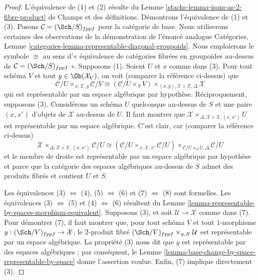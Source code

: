\begin{proof}
L'équivalence de (1) et (2) résulte du
Lemme \ref{stacks-lemma-isom-as-2-fibre-product} de Champs
et des définitions.
Démontrons l'équivalence de (1) et (3).
Posons $\mathcal{C} = (\Sch/S)_{fppf}$ pour la catégorie de base.
Nous utiliserons certaines des observations de la démonstration de l'énoncé analogue
Catégories, Lemme \ref{categories-lemma-representable-diagonal-groupoids}.
Nous emploierons le symbole $\cong$ au sens d'« équivalence de catégories fibrées
en groupoïdes au-dessus de $\mathcal{C} = (\Sch/S)_{fppf}$ ».
Supposons (1). Soient $U$ et $x$ comme dans (3). Pour tout schéma $V$
et tout $y \in \Ob(\mathcal{X}_V)$, on voit (comparer la référence ci-dessus) que
$$
\mathcal{C}/U
\times_{x, \mathcal{X}, y}
\mathcal{C}/V
\cong
(\mathcal{C}/U \times_S V)
\times_{(x, y), \mathcal{X} \times \mathcal{X}, \Delta}
\mathcal{X}
$$
qui est représentable par un espace algébrique par hypothèse. Réciproquement,
supposons (3). Considérons un schéma $U$ quelconque au-dessus de $S$ et une paire $(x, x')$
d'objets de $\mathcal{X}$ au-dessus de $U$. Il faut montrer que
$\mathcal{X} \times_{\Delta, \mathcal{X} \times \mathcal{X}, (x, x')} U$
est représentable par un espace algébrique. C'est clair, car
(comparer la référence ci-dessus)
$$
\mathcal{X}
\times_{\Delta, \mathcal{X} \times \mathcal{X}, (x, x')}
\mathcal{C}/U
\cong
(\mathcal{C}/U \times_{x, \mathcal{X}, x'} \mathcal{C}/U)
\times_{\mathcal{C}/U \times_S U, \Delta}
\mathcal{C}/U
$$
et le membre de droite est représentable par un espace algébrique par hypothèse
et parce que la catégorie des espaces algébriques au-dessus de $S$ admet des produits fibrés
et contient $U$ et $S$.

\medskip\noindent
Les équivalences
(3) $\Leftrightarrow$ (4),
(5) $\Leftrightarrow$ (6)
et
(7) $\Leftrightarrow$ (8)
sont formelles. Les équivalences
(3) $\Leftrightarrow$ (5) et
(4) $\Leftrightarrow$ (6)
résultent du
Lemme \ref{lemma-representable-by-spaces-morphism-equivalent}.
Supposons (3), et soit $\mathcal{U} \to \mathcal{X}$ comme dans (7).
Pour démontrer (7), il faut montrer que, pour tout schéma $V$ et tout $1$-morphisme
$y : (\Sch/V)_{fppf} \to \mathcal{X}$, le $2$-produit fibré
$(\Sch/V)_{fppf} \times_{y, \mathcal{X}} \mathcal{U}$
est représentable par un espace algébrique. La propriété (3) nous dit
que $y$ est représentable par des espaces algébriques ; par conséquent, le
Lemme \ref{lemma-base-change-by-space-representable-by-space}
donne l'assertion voulue. Enfin, (7) implique directement (3).
\end{proof}

